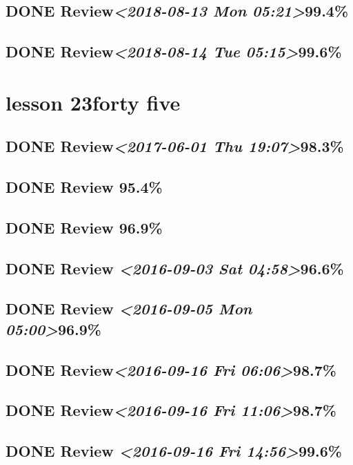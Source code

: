\documentclass[11pt]{ctexart}
\begin{document}
\subsection{{\bfseries\sffamily DONE} Review\textit{<2018-08-13 Mon 05:21>}99.4\%}
\label{sec:org458c9d7}
\subsection{{\bfseries\sffamily DONE} Review\textit{<2018-08-14 Tue 05:15>}99.6\%}
\label{sec:org11fb2fa}
\section{lesson 23forty five}
\label{sec:org9ab6994}
\subsection{{\bfseries\sffamily DONE} Review\textit{<2017-06-01 Thu 19:07>}98.3\%}
\label{sec:orgc69b4e7}
\subsection{{\bfseries\sffamily DONE} Review 95.4\%}
\label{sec:org0568f81}
\subsection{{\bfseries\sffamily DONE} Review 96.9\%}
\label{sec:orgc971326}
\subsection{{\bfseries\sffamily DONE} Review \textit{<2016-09-03 Sat 04:58>}96.6\%}
\label{sec:orgafddec4}
\subsection{{\bfseries\sffamily DONE} Review \textit{<2016-09-05 Mon 05:00>}96.9\%}
\label{sec:orged4d827}
\subsection{{\bfseries\sffamily DONE} Review\textit{<2016-09-16 Fri 06:06>}98.7\%}
\label{sec:orgf3f2a87}
\subsection{{\bfseries\sffamily DONE} Review\textit{<2016-09-16 Fri 11:06>}98.7\%}
\label{sec:orgdcc9a18}
\subsection{{\bfseries\sffamily DONE} Review \textit{<2016-09-16 Fri 14:56>}99.6\%}
\label{sec:orgde8cd00}
\end{document}
